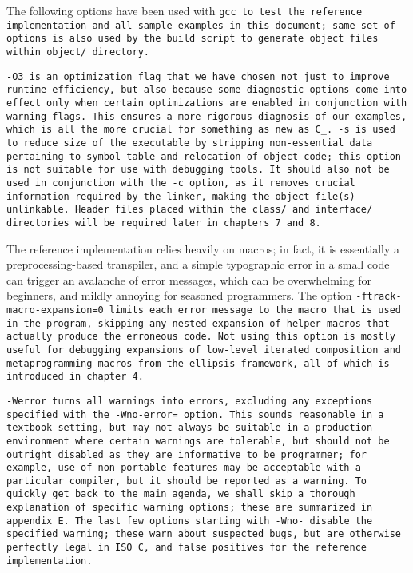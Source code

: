 The following options have been used with \tt{gcc} to test the
reference implementation and all sample examples in this document;
same set of options is also used by the build script
to generate object files within \tt{object/} directory.


\tt{-O3} is an optimization flag that we have chosen not just to improve
runtime efficiency, but also because some diagnostic options come into effect
only when certain optimizations are enabled in conjunction with warning flags.
This ensures a more rigorous diagnosis of our examples,
which is all the more crucial for something as new as C\_.
\tt{-s} is used to reduce size of the executable by stripping non-essential
data pertaining to symbol table and relocation of object code;
this option is not suitable for use with debugging tools.
It should also not be used in conjunction with the \tt{-c} option,
as it removes crucial information required by the linker,
making the object file(s) unlinkable.
Header files placed within the \tt{class/} and \tt{interface/}
directories will be required later in chapters 7 and 8.

The reference implementation relies heavily on macros;
in fact, it is essentially a preprocessing-based transpiler,
and a simple typographic error in a small code can trigger an
avalanche of error messages, which can be overwhelming for beginners,
and mildly annoying for seasoned programmers.
The option \tt{-ftrack-macro-expansion=0} limits each error message to the
macro that is used in the program, skipping any nested expansion of helper
macros that actually produce the erroneous code.
Not using this option is mostly useful for debugging expansions
of low-level iterated composition and metaprogramming macros from
the ellipsis framework, all of which is introduced in chapter 4.

\tt{-Werror} turns all warnings into errors,
excluding any exceptions specified with the \tt{-Wno-error=} option.
This sounds reasonable in a textbook setting, but may not always be
suitable in a production environment where certain warnings are tolerable,
but should not be outright disabled as they are informative to be programmer;
for example, use of non-portable features may be acceptable with a
particular compiler, but it should be reported as a warning.
To quickly get back to the main agenda, we shall skip a thorough explanation
of specific warning options; these are summarized in appendix E.
The last few options starting with \tt{-Wno-} disable the specified
warning; these warn about suspected bugs, but are otherwise perfectly
legal in ISO C, and false positives for the reference implementation.
